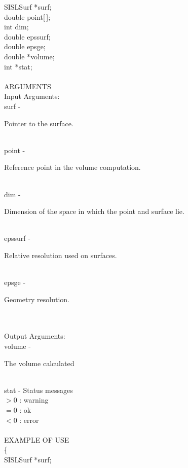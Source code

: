 		\>\>	SISLSurf	\> 	*{\fov surf};\\
		\>\>	double	\>	{\fov point}[\,];\\
		\>\>	int	\>	{\fov dim};\\
		\>\>	double 	\>	{\fov epssurf};\\
		\>\>	double	\>	{\fov epsge};\\
		\>\>	double	\>	*{\fov volume};\\
		\>\>	int 	\>	*{\fov stat};\\
\\
ARGUMENTS\\
	\>Input Arguments:\\
	\>\>	{\fov surf}\> - \>	\begin{minipg2}
				Pointer to the surface.
				\end{minipg2}\\
	\>\>	{\fov point}\> - \>	\begin{minipg2}
				Reference point in the volume computation.
				\end{minipg2}\\
	\>\>	{\fov dim}\> - \>	\begin{minipg2}
				Dimension of the space in which the point and surface lie.
				\end{minipg2}\\
	\>\>	{\fov epssurf}\> - \>	\begin{minipg2}
				Relative resolution used on surfaces.
				\end{minipg2} \\
	\>\>	{\fov epsge}\> - \> \begin{minipg2}
				Geometry resolution.
				\end{minipg2}\\
\\
	\>Output Arguments:\\
	\>\>	{\fov volume}\> - \>	\begin{minipg2}
				The volume calculated
				\end{minipg2}\\
	\>\>	{\fov stat}	\> - \>	Status messages\\
		\>\>\>\>\>		$> 0$	: warning\\
		\>\>\>\>\>		$= 0$	: ok\\
		\>\>\>\>\>		$< 0$	: error\\
\\
EXAMPLE OF USE\\
		\>	\{ \\
		\>\>	SISLSurf	\> 	*{\fov surf};\\
